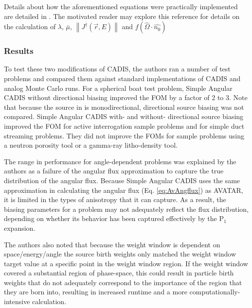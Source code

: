 Details about how the aforementioned equations were practically implemented are
detailed in \cite{peplow_consistent_2012}. The motivated reader may explore this
reference for details on the calculation of $\lambda$, $\bar{\mu}$,
$\left\| J^{\dagger}(\vec{r}, E)\right\|$ and $f(\hat\Omega \cdot \hat{n_0})$

\subsubsection*{Results}

To test these two modifications of CADIS, the authors ran a number of test
problems and
compared them against standard implementations of CADIS and analog Monte Carlo
runs. For a spherical boat test problem, Simple Angular CADIS without
directional biasing improved the FOM by a factor of 2 to 3. Note that because
the source in is monodirectional, directional source biasing was not compared.
Simple Angular CADIS with- and without- directional source biasing improved the
FOM for active interrogation sample problems and for simple duct streaming
problems. They did not improve the FOMs for sample problems using a neutron
porosity tool or a gamma-ray litho-density tool.

The range in performance for
angle-dependent problems was explained by the authors as a failure of the
angular flux approximation to capture the true distribution of the angular flux.
Because Simple Angular CADIS uses the same approximation in calculating the
angular flux (Eq. \eqref{eq:AvAngflux}) as AVATAR, it is limited in the types of anisotropy
that it can capture. As a result, the biasing parameters for a problem may not
adequately reflect the flux distribution, depending on whether its behavior has
been captured effectively by the P$_1$ expansion.

The authors also noted that because the weight window is dependent on
space/energy/angle the source birth weights only matched
the weight window target value at a specific point in the weight window region.
If the weight window covered a substantial region of phase-space, this could
result in particle birth weights that do not adequately correspond to the
importance of the region that they are born into, resulting in increased runtime
and a more computationally-intensive calculation.

